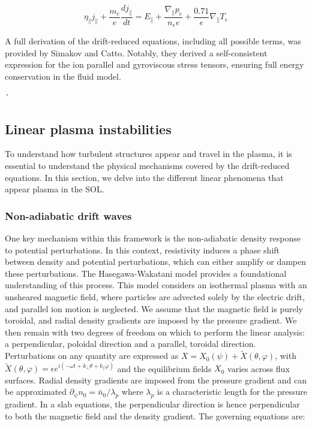 \begin{equation}
	\eta_\parallel j_\parallel + \frac{m_e}{e}\frac{dj_\parallel}{dt} = E_\parallel + \frac{\nabla_\parallel p_e}{n_e e} + \frac{0.71}{e}\nabla_\parallel T_e
\end{equation}

A full derivation of the drift-reduced equations, including all possible terms, was provided by Simakov and Catto\cite{simakov_2003}. Notably, they derived a self-consistent expression for the ion parallel and gyroviscous stress tensors, ensuring full energy conservation in the fluid model.


´

\subsection{Linear plasma instabilities}
\label{ssec:edge_linearDriftWaves}

To understand how turbulent structures appear and travel in the plasma, it is essential to understand the physical mechanisms covered by the drift-reduced equations. In this section, we delve into the different linear phenomena that appear plasma in the SOL.



\subsubsection{Non-adiabatic drift waves}
\label{ssec:edge_nonAdiabaticResponse}
One key mechanism within this framework is the non-adiabatic density response to potential perturbations. In this context, resistivity induces a phase shift between density and potential perturbations, which can either amplify or dampen these perturbations. The Hasegawa-Wakatani model \cite{hasegawa1983plasma} provides a foundational understanding of this process. This model considers an isothermal plasma with an unsheared magnetic field, where particles are advected solely by the electric drift, and parallel ion motion is neglected. We assume that the magnetic field is purely toroidal, and radial density gradients are imposed by the pressure gradient. We then remain with two degrees of freedom on which to perform the linear analysis: a perpendicular, poloidal direction and a parallel, toroidal direction. Perturbations on any quantity are expressed as $ X = X_0(\psi) + \tilde{X}(\theta,\varphi) $, with $\tilde{X}(\theta,\varphi) = \epsilon e^{i(-\omega t + k_\perp\theta+k_\parallel\varphi )}$ and the equilibrium fields $ X_0 $ varies across flux surfaces. Radial density gradients are imposed from the pressure gradient and can be approximated $\partial_\psi n_0 = \bar{n}_0 / \lambda_p$ where $\lambda_p$ is a characteristic length for the pressure gradient. In a slab equations, the perpendicular direction is hence perpendicular to both the magnetic field and the density gradient. The governing equations are:

